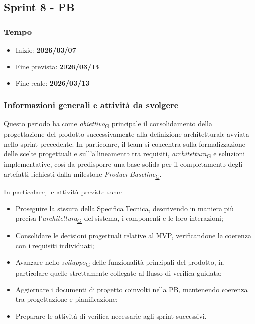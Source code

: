 \documentclass[a4paper,12pt]{article}
\begin{document}
 \newpage
    
\subsection{Sprint 8 - PB}{
    \subsubsection{Tempo}{
        \begin{itemize}
            \item[] Inizio: \textbf{2026/03/07} 
            \item[] Fine prevista: \textbf{2026/03/13} 
            \item[] Fine reale: \textbf{2026/03/13} 
        \end{itemize}
    }

    \subsubsection{Informazioni generali e attività da svolgere}{
        Questo periodo ha come \textit{obiettivo}\textsubscript{\href{https://atlasteam9.github.io/Atlas/glossario.html\#Obiettivo}{G}} principale il consolidamento della progettazione del prodotto successivamente alla definizione architetturale avviata nello sprint precedente. In particolare, il team si concentra sulla formalizzazione delle scelte progettuali e sull'allineamento tra requisiti, \textit{architettura}\textsubscript{\href{https://atlasteam9.github.io/Atlas/glossario.html\#Architettura}{G}} e soluzioni implementative, così da predisporre una base solida per il completamento degli artefatti richiesti dalla milestone \textit{Product Baseline}\textsubscript{\href{https://atlasteam9.github.io/Atlas/glossario.html\#Baseline}{G}}.
    }
            
    \noindent In particolare, le attività previste sono:
            \begin{itemize}
                \item Proseguire la stesura della Specifica Tecnica, descrivendo in maniera più precisa l'\textit{architettura}\textsubscript{\href{https://atlasteam9.github.io/Atlas/glossario.html\#Architettura}{G}} del sistema, i componenti e le loro interazioni;
                \item Consolidare le decisioni progettuali relative al MVP, verificandone la coerenza con i requisiti individuati;
                \item Avanzare nello \textit{sviluppo}\textsubscript{\href{https://atlasteam9.github.io/Atlas/glossario.html\#Sviluppo}{G}} delle funzionalità principali del prodotto, in particolare quelle strettamente collegate al flusso di verifica guidata;
                \item Aggiornare i documenti di progetto coinvolti nella PB, mantenendo coerenza tra progettazione e pianificazione;
                \item Preparare le attività di verifica necessarie agli sprint successivi.
            \end{itemize}
        }
\end{document}
